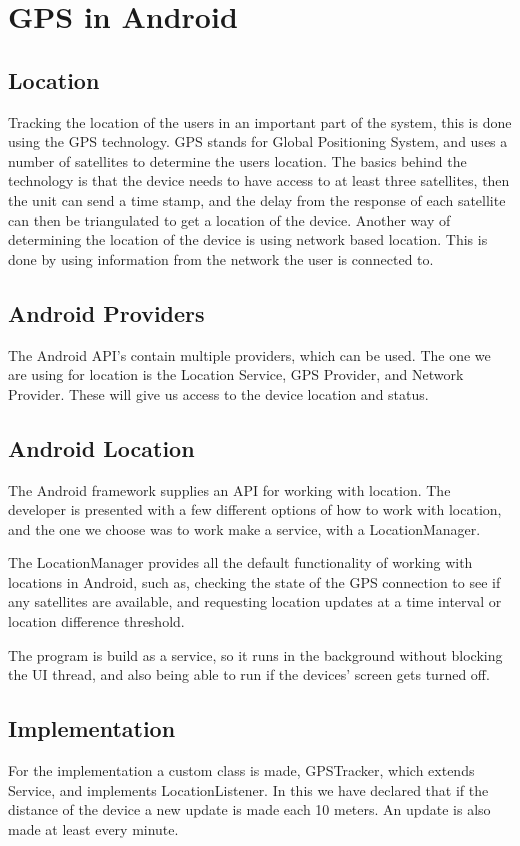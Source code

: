 \section{GPS in Android}

\subsection{Location}

Tracking the location of the users in an important part of the system, this is done using the GPS technology.
GPS stands for Global Positioning System, and uses a number of satellites to determine the users location.
The basics behind the technology is that the device needs to have access to at least three satellites, then the unit can send a time stamp, and the delay from the response of each satellite can then be triangulated to get a location of the device.
Another way of determining the location of the device is using network based location. This is done by using information from the network the user is connected to.


\subsection{Android Providers}
The Android API's contain multiple providers, which can be used. The one we are using for location is the Location Service, GPS Provider, and Network Provider. These will give us access to the device location and status.


\subsection{Android Location}
The Android framework supplies an API for working with location.
The developer is presented with a few different options of how to work with location, and the one we choose was to work make a service, with a LocationManager.

The LocationManager provides all the default functionality of working with locations in Android, such as, checking the state of the GPS connection to see if any satellites are available, and requesting location updates at a time interval or location difference threshold.

The program is build as a service, so it runs in the background without blocking the UI thread, and also being able to run if the devices' screen gets turned off.


\subsection{Implementation}
For the implementation a custom class is made, GPSTracker, which extends Service, and implements LocationListener.
In this we have declared that if the distance of the device a new update is made each 10 meters. An update is also made at least every minute.


